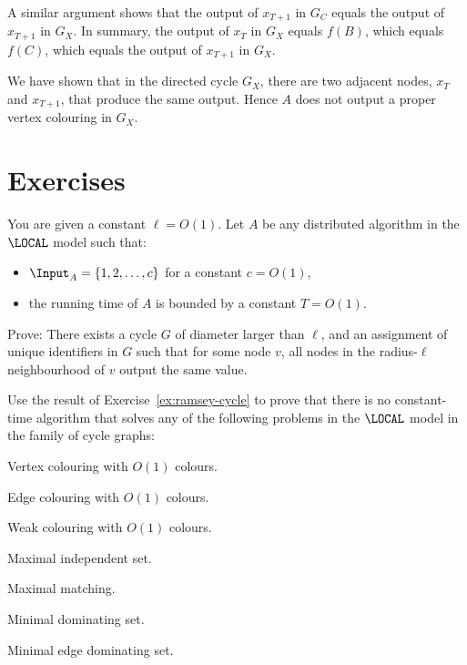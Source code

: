 A similar argument shows that the output of $x_{T+1}$ in $G_C$ equals the output of $x_{T+1}$ in $G_X$. In summary, the output of $x_{T}$ in $G_X$ equals $f(B)$, which equals $f(C)$, which equals the output of $x_{T+1}$ in $G_X$.

We have shown that in the directed cycle $G_X$, there are two adjacent nodes, $x_T$ and $x_{T+1}$, that produce the same output. Hence $A$ does not output a proper vertex colouring in $G_X$.


\section{Exercises}

\begin{ex}\label{ex:ramsey-cycle}
    You are given a constant $\ell = O(1)$. Let $A$ be any distributed algorithm in the $\LOCAL$ model such that:
    \begin{itemize}[noitemsep]
        \item $\Input_A = \{1,2,\dotsc,c\}$ for a constant $c = O(1)$,
        \item the running time of $A$ is bounded by a constant $T = O(1)$.
    \end{itemize}
    Prove: There exists a cycle $G$ of diameter larger than $\ell$, and an assignment of unique identifiers in $G$ such that for some node $v$, all nodes in the radius-$\ell$ neighbourhood of $v$ output the same value.
\end{ex}

\begin{ex}\label{ex:ramsey-cycle-app}
    Use the result of Exercise~\ref{ex:ramsey-cycle} to prove that there is no constant-time algorithm that solves any of the following problems in the $\LOCAL$ model in the family of cycle graphs:
    \begin{subex}[noitemsep]
        \item Vertex colouring with $O(1)$ colours.
        \item Edge colouring with $O(1)$ colours.
        \item Weak colouring with $O(1)$ colours.
        \item Maximal independent set.
        \item Maximal matching.
        \item Minimal dominating set.
        \item Minimal edge dominating set.
    \end{subex}
\end{ex}

